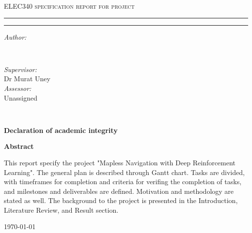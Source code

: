 \begin{titlepage}
\center %



\vspace{8mm}

\textsc{\Large ELEC340 specification report for project}

\vspace{8mm}

\makeatletter
\rule[6mm]{\linewidth}{0.75mm}
{\large\bfseries\@title}
\rule[-3mm]{\linewidth}{0.75mm}

\vspace{4mm}

\begin{minipage}{0.4\textwidth}
\begin{flushleft}
   \emph{Author:} \\
   \@author
\end{flushleft}
\end{minipage}
~
\begin{minipage}{0.4\textwidth}
\begin{flushright}
   \emph{Supervisor:} \\
   Dr Murat Uney \\[1.2em]
   \emph{Assessor:} \\
   Unassigned
\end{flushright}
\end{minipage}\\[0.7cm]
\makeatother

\textbf{Declaration of academic integrity}
\begin{spacing}{1.1}
\end{spacing}

\vspace{3mm}

\textbf{Abstract}
\begin{spacing}{0.8}
\parbox{0.85\textwidth}{
   This report specify the project "Mapless Navigation with Deep Reinforcement Learning". The general plan is described through Gantt chart. Tasks are divided, with timeframes for completion and criteria for verifing the completion of tasks, and milestones and deliverables are defined. Motivation and methodology are stated as well. The background to the project is presented in the Introduction, Literature Review, and Result section.
} 
\end{spacing}

\vfill

{\large\today}

\end{titlepage}
